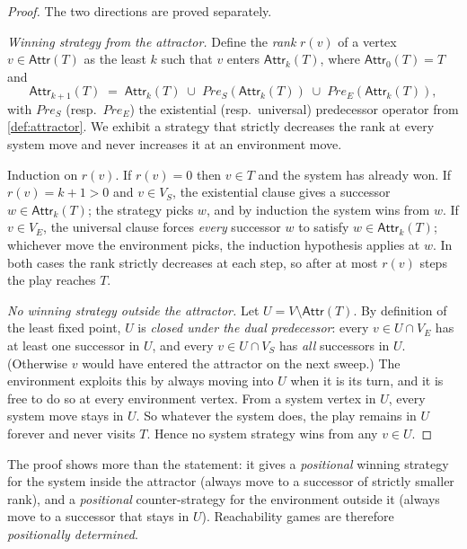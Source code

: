 \begin{proof}
The two directions are proved separately.

\smallskip
\noindent\textit{Winning strategy from the attractor.}
Define the \emph{rank} $r(v)$ of a vertex $v\in\mathsf{Attr}(T)$ as the
least $k$ such that $v$ enters $\mathsf{Attr}_k(T)$, where
$\mathsf{Attr}_0(T)=T$ and
\[
  \mathsf{Attr}_{k+1}(T)
  \;=\;\mathsf{Attr}_k(T)\;\cup\;
  \textit{Pre}_S(\mathsf{Attr}_k(T))\;\cup\;
  \textit{Pre}_E(\mathsf{Attr}_k(T)),
\]
with $\textit{Pre}_S$ (resp.\ $\textit{Pre}_E$) the existential
(resp.\ universal) predecessor operator from \cref{def:attractor}.  We
exhibit a strategy that strictly decreases the rank at every system
move and never increases it at an environment move.

Induction on $r(v)$.  If $r(v)=0$ then $v\in T$ and the system has
already won.  If $r(v)=k+1>0$ and $v\in V_S$, the existential clause
gives a successor $w\in\mathsf{Attr}_k(T)$; the strategy picks $w$, and
by induction the system wins from $w$.  If $v\in V_E$, the universal
clause forces \emph{every} successor $w$ to satisfy
$w\in\mathsf{Attr}_k(T)$; whichever move the environment picks, the
induction hypothesis applies at $w$.  In both cases the rank strictly
decreases at each step, so after at most $r(v)$ steps the play reaches
$T$.

\smallskip
\noindent\textit{No winning strategy outside the attractor.}
Let $U=V\setminus\mathsf{Attr}(T)$.  By definition of the least fixed
point, $U$ is \emph{closed under the dual predecessor}: every
$v\in U\cap V_E$ has at least one successor in $U$, and every
$v\in U\cap V_S$ has \emph{all} successors in $U$.  (Otherwise $v$
would have entered the attractor on the next sweep.)  The environment
exploits this by always moving into $U$ when it is its turn, and it is
free to do so at every environment vertex.  From a system vertex in
$U$, every system move stays in $U$.  So whatever the system does, the
play remains in $U$ forever and never visits $T$.  Hence no system
strategy wins from any $v\in U$.
\end{proof}

The proof shows more than the statement: it gives a \emph{positional}
winning strategy for the system inside the attractor (always move to a
successor of strictly smaller rank), and a \emph{positional}
counter-strategy for the environment outside it (always move to a
successor that stays in $U$).  Reachability games are therefore
\emph{positionally determined}.


